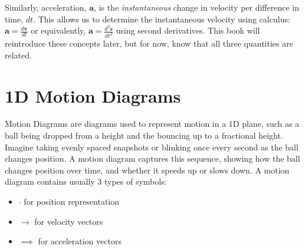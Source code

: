 Similarly, acceleration, $\mathbf a$, is the \emph{instantaneous} change in velocity per difference in time, $dt$. This allows us to determine the instantaneous velocity using calculus: $\mathbf a = \tfrac{d\mathbf v}{dt}$ or equivalently, $\mathbf a = \tfrac{d^2\mathbf s}{dt^2}$ using second derivatives. This book will reintroduce these concepts later, but for now, know that all three quantities are related. 


\section{1D Motion Diagrams}
Motion Diagrams are diagrams used to represent motion in a 1D plane, such as a ball being dropped from a height and the bouncing up to a fractional height. Imagine taking evenly spaced snapshots or blinking once every second as the ball changes position. A motion diagram captures this sequence, showing how the ball changes position over time, and whether it speeds up or slows down. A motion diagram contains usually 3 types of symbols:
\begin{itemize}
    \item $\cdot$ for position representation
    \item $\rightarrow$ for velocity vectors
    \item $\implies$ for acceleration vectors
\end{itemize}

